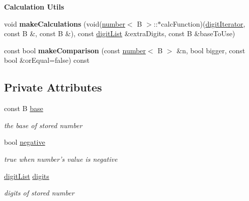 \begin{Indent}{\bf Calculation Utils}
\begin{DoxyCompactItemize}
\item 
\hypertarget{classcjr_1_1number_af366a07fcb161a13f2a09a2ecb7c1b9a}{void {\bfseries make\-Calculations} (void(\hyperlink{classcjr_1_1number}{number}$<$ B $>$\-::$\ast$calc\-Function)(\hyperlink{classcjr_1_1number_a137416a57d724f8b6a5c14bab7c6802b}{digit\-Iterator}, const B \&, const B \&), const \hyperlink{classcjr_1_1number_a64ca3e7862f3f4940065b93d38c1a465}{digit\-List} \&extra\-Digits, const B \&base\-To\-Use)}\label{classcjr_1_1number_af366a07fcb161a13f2a09a2ecb7c1b9a}

\item 
\hypertarget{classcjr_1_1number_ae04bab77e45873820a30f2432a3c4779}{const bool {\bfseries make\-Comparison} (const \hyperlink{classcjr_1_1number}{number}$<$ B $>$ \&n, bool bigger, const bool \&or\-Equal=false) const }\label{classcjr_1_1number_ae04bab77e45873820a30f2432a3c4779}

\end{DoxyCompactItemize}
\end{Indent}
\subsection*{Private Attributes}
\begin{DoxyCompactItemize}
\item 
\hypertarget{classcjr_1_1number_abb42f009bce42f2050a7bd66e029b931}{const B \hyperlink{classcjr_1_1number_abb42f009bce42f2050a7bd66e029b931}{base}}\label{classcjr_1_1number_abb42f009bce42f2050a7bd66e029b931}

\begin{DoxyCompactList}\small\item\em the base of stored number \end{DoxyCompactList}\item 
\hypertarget{classcjr_1_1number_a3712887e1b8ecee31c396b78b6d62073}{bool \hyperlink{classcjr_1_1number_a3712887e1b8ecee31c396b78b6d62073}{negative}}\label{classcjr_1_1number_a3712887e1b8ecee31c396b78b6d62073}

\begin{DoxyCompactList}\small\item\em true when number's value is negative \end{DoxyCompactList}\item 
\hypertarget{classcjr_1_1number_a264ee3b2d320bdba897ba93b72a6b849}{\hyperlink{classcjr_1_1number_a64ca3e7862f3f4940065b93d38c1a465}{digit\-List} \hyperlink{classcjr_1_1number_a264ee3b2d320bdba897ba93b72a6b849}{digits}}\label{classcjr_1_1number_a264ee3b2d320bdba897ba93b72a6b849}

\begin{DoxyCompactList}\small\item\em digits of stored number \end{DoxyCompactList}\end{DoxyCompactItemize}
